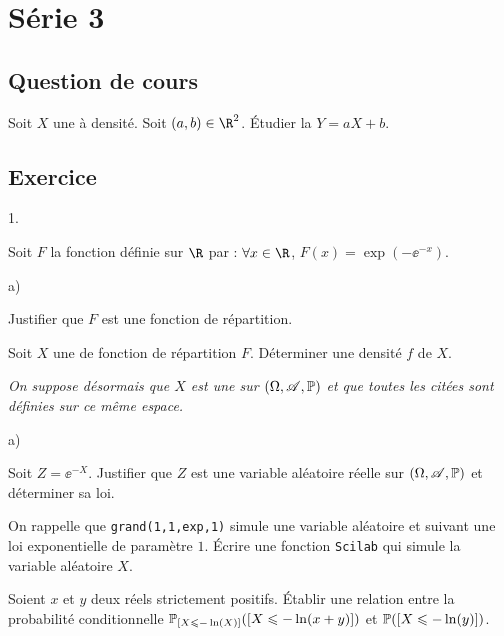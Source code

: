 \documentclass[11pt]{article}%
\begin{document}
\newpage
 
\section*{Série 3}
\subsection*{Question de cours}
\noindent
Soit $X$ une \var à densité. Soit $(a,b)\in\R^2$. Étudier la \var 
$Y=aX+b$.

\subsection*{Exercice} %
\noindent
\begin{noliste}{1.}
 \item Soit $F$ la fonction définie sur $\R$ par : $\forall x\in\R$, 
 $F(x)=\exp\left(-\ee^{-x}\right)$.
 \begin{noliste}{a)}
  \item Justifier que $F$ est une fonction de répartition.
  \item Soit $X$ une \var de fonction de répartition $F$. Déterminer 
  une densité $f$ de $X$.
 \end{noliste}
 {\it On suppose désormais que $X$ est une \var sur $(\Omega, \mathscr{A}, 
 \mathbb{P})$ et que toutes les \var citées sont définies sur ce même 
 espace.}
 
 \item 
 \begin{noliste}{a)}
  \item Soit $Z=\ee^{-X}$. Justifier que $Z$ est une variable aléatoire 
  réelle sur $(\Omega, \mathscr{A}, \mathbb{P})$ et déterminer sa loi.
  \item On rappelle que {\tt grand(1,1,\ttq{}exp\ttq{},1)} simule
    une variable aléatoire et suivant une loi
    exponentielle de paramètre $1$. Écrire une
    fonction {\tt Scilab} qui simule la variable
    aléatoire $X$.
  \item Soient $x$ et $y$ deux réels strictement positifs. Établir une 
  relation entre la probabilité conditionnelle 
  $\mathbb{P}_{\left[ {X\leqslant -\ln(X)} \right]}(\left[ {X\leqslant -\ln(x+y)} \right])$ et 
  $\mathbb{P}(\left[ {X\leqslant - \ln(y)} \right])$.
 \end{noliste}
 

\end{noliste}
\end{document}
